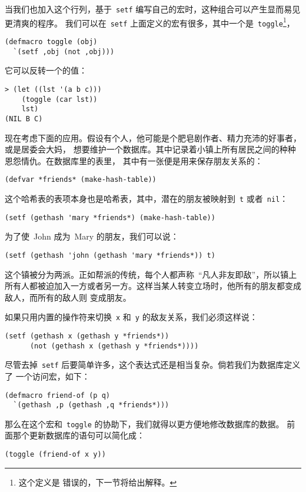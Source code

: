 当我们也加入这个行列，基于~\verb|setf| 编写自己的宏时，这种组合可以产生显而易见更清爽的程序。
我们可以在~\verb|setf| 上面定义的宏有很多，其中一个是~\verb|toggle|\footnote{这个定义是
错误的，下一节将给出解释。}，
\begin{lstlisting}
(defmacro toggle (obj)
  `(setf ,obj (not ,obj)))
\end{lstlisting}
它可以反转一个\gv{}的值：
\begin{lstlisting}
> (let ((lst '(a b c)))
    (toggle (car lst))
    lst)
(NIL B C)
\end{lstlisting}

现在考虑下面的应用。假设有个人，他可能是个肥皂剧作者、精力充沛的好事者，或是居委会大妈，
想要维护一个数据库。其中记录着小镇上所有居民之间的种种恩怨情仇。在数据库里的表里，
其中有一张便是用来保存朋友关系的：
\begin{lstlisting}
(defvar *friends* (make-hash-table))
\end{lstlisting}
这个哈希表的表项本身也是哈希表，其中，潜在的朋友被映射到~\texttt{t} 或者~\texttt{nil}：
\begin{lstlisting}
(setf (gethash 'mary *friends*) (make-hash-table))
\end{lstlisting}
为了使~John 成为~Mary 的朋友，我们可以说：
\begin{lstlisting}
(setf (gethash 'john (gethash 'mary *friends*)) t)
\end{lstlisting}

这个镇被分为两派。正如帮派的传统，每个人都声称~``凡人非友即敌''，所以镇上
所有人都被迫加入一方或者另一方。这样当某人转变立场时，他所有的朋友都变成敌人，而所有的敌人则
变成朋友。

如果只用内置的操作符来切换~\verb|x| 和~\verb|y| 的敌友关系，我们必须这样说：
\begin{lstlisting}
(setf (gethash x (gethash y *friends*))
      (not (gethash x (gethash y *friends*))))
\end{lstlisting}
尽管去掉~\verb|setf| 后要简单许多，这个表达式还是相当复杂。倘若我们为数据库定义了
一个访问宏，如下：
\begin{lstlisting}
(defmacro friend-of (p q)
  `(gethash ,p (gethash ,q *friends*)))
\end{lstlisting}
那么在这个宏和~\verb|toggle| 的协助下，我们就得以更方便地修改数据库的数据。
前面那个更新数据库的语句可以简化成：
\begin{lstlisting}
(toggle (friend-of x y))
\end{lstlisting}

